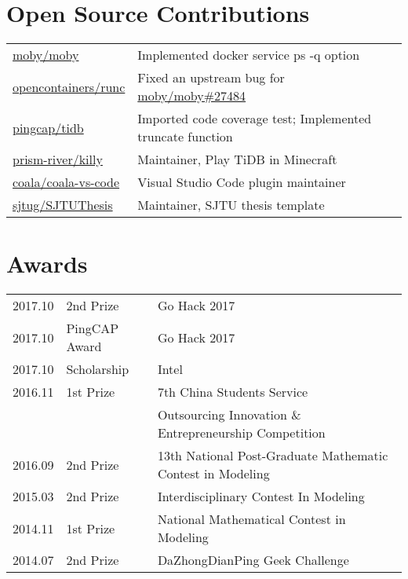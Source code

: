 \documentclass[]{deedy-resume-openfont}
\begin{document}
\begin{minipage}[t]{0.73\textwidth}
\section{Open Source Contributions}
\begin{tabular}{ll}
\href{https://github.com/moby/moby/commits?author=gaocegege}{moby/moby} & Implemented docker service ps -q option \\
\href{https://github.com/opencontainers/runc/commits?author=gaocegege}{opencontainers/runc} & Fixed an upstream bug for \href{https://github.com/moby/moby/issues/27484}{moby/moby\#27484} \\
\href{https://github.com/pingcap/tidb/commits?author=gaocegege}{pingcap/tidb} & Imported code coverage test; Implemented truncate function \\
\href{https://github.com/prism-river/killy}{prism-river/killy} & Maintainer, Play TiDB in Minecraft \\
\href{https://github.com/coala/coala-vs-code/commits/master?author=gaocegege}{coala/coala-vs-code} & Visual Studio Code plugin maintainer \\
\href{https://github.com/sjtug/SJTUThesis/commits?author=gaocegege}{sjtug/SJTUThesis} & Maintainer, SJTU thesis template \\
\end{tabular}
\sectionsep


\section{Awards}
\begin{tabular}{rll}
2017.10     & 2nd Prize             & Go Hack 2017 \\
2017.10     & PingCAP Award         & Go Hack 2017 \\
2017.10     & Scholarship           & Intel \\
2016.11	    & 1st Prize             & 7th China Students Service \\
&                       & Outsourcing Innovation \& Entrepreneurship Competition \\
2016.09	    & 2nd Prize             & 13th National Post-Graduate Mathematic Contest in Modeling \\
2015.03	    & 2nd Prize             & Interdisciplinary Contest In Modeling \\
2014.11     & 1st Prize             & National Mathematical Contest in Modeling \\
2014.07	    & 2nd Prize             & DaZhongDianPing Geek Challenge \\
\end{tabular}
\sectionsep


% 
% 

\end{minipage}
\end{document}
